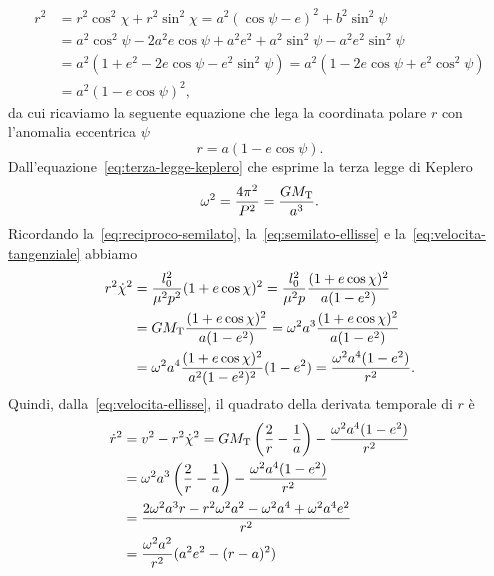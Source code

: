 \begin{equation}
  \begin{split}
    r^2 &= r^2\cos^2\chi + r^2\sin^2\chi = a^2(\cos\psi - e)^2 + b^2\sin^2\psi\\
    &= a^2\cos^2\psi-2a^2e\cos\psi+a^2e^2+a^2\sin^2\psi-a^2e^2\sin^2\psi\\
    &= a^2(1+e^2-2e\cos\psi-e^2\sin^2\psi) = a^2(1-2e\cos\psi+e^2\cos^2\psi)\\
    &= a^2(1 - e\cos\psi)^2,
  \end{split}
\end{equation}
da cui ricaviamo la seguente equazione che lega la coordinata polare $r$ con
l'anomalia eccentrica $\psi$
\begin{equation}
  \label{eq:r-anomalia-eccentrica}
  r = a(1 - e\cos\psi).
\end{equation}
Dall'equazione~\eqref{eq:terza-legge-keplero} che esprime la terza legge di
Keplero
\begin{equation}
  \omega^2 = \frac{4\pi^2}{P^2} = \frac{GM_\textup{T}}{a^3}.
\end{equation}
Ricordando la~\eqref{eq:reciproco-semilato}, la~\eqref{eq:semilato-ellisse} e
la~\eqref{eq:velocita-tangenziale} abbiamo
\begin{equation}
  \begin{split}
    r^2\dot{\chi}^2 &= \frac{l_0^2}{\mu^2p^2}(1 + e\cos\chi)^2 =
    \frac{l_0^2}{\mu^2p} \frac{(1+e\cos\chi)^2}{a(1-e^2)} \\
    &= GM_\textup{T} \frac{(1+e\cos\chi)^2}{a(1-e^2)} = \omega^2a^3
    \frac{(1+e\cos\chi)^2}{a(1-e^2)} \\
    &= \omega^2a^4 \frac{(1+e\cos\chi)^2}{a^2(1-e^2)^2}(1-e^2) =
    \frac{\omega^2a^4(1-e^2)}{r^2}.
  \end{split}
\end{equation}
Quindi, dalla~\eqref{eq:velocita-ellisse}, il quadrato della derivata temporale
di $r$ è
\begin{equation}
  \begin{split}
    \dot{r}^2 &= v^2 - r^2\dot{\chi}^2 = GM_\textup{T}
    \left(
      \frac{2}{r} - \frac{1}{a}
    \right) - \frac{\omega^2a^4(1-e^2)}{r^2} \\
        &= \omega^2a^3
    \left(
      \frac{2}{r} - \frac{1}{a}
    \right) - \frac{\omega^2a^4(1-e^2)}{r^2} \\
    &= \frac{2\omega^2a^3r-r^2\omega^2a^2-\omega^2a^4+\omega^2a^4e^2}{r^2}\\
    &= \frac{\omega^2a^2}{r^2}(a^2e^2-(r-a)^2)
  \end{split}
\end{equation}
